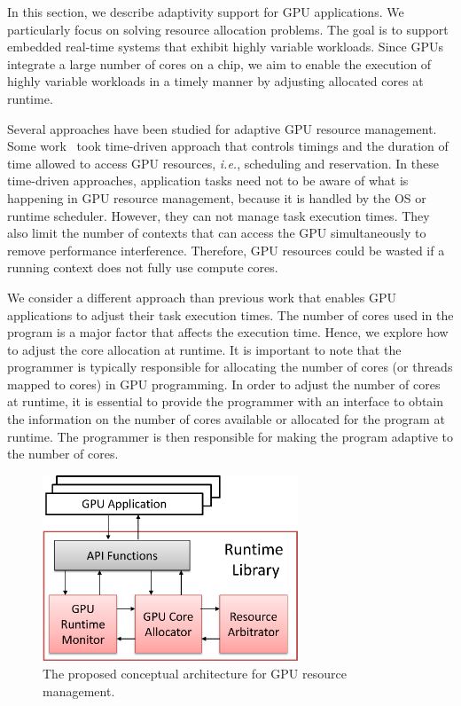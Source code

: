 \documentclass[times, 10pt, twocolumn]{article}
\begin{document}
In this section, we describe adaptivity support for GPU
applications.
We particularly focus on solving resource allocation problems.
The goal is to support embedded real-time systems that exhibit highly variable
workloads.
Since GPUs integrate a large number of cores on a chip, 
we aim to enable the execution of 
highly variable workloads in a timely manner by adjusting
allocated cores at runtime.

Several approaches have been studied for adaptive GPU resource
management.
Some work~\cite{Kato_RTAS11, Kato_RTSS11, Kato_ATC11} took
time-driven approach that controls timings and the duration of time
allowed to access GPU resources, \textit{i.e.}, scheduling and
reservation.
In these time-driven approaches, application tasks need not to be aware
of what is happening in GPU resource management, because it is handled
by the OS or runtime scheduler.
However, they can not manage task execution times.
They also limit the number of contexts that can access the GPU
simultaneously to remove performance interference.
Therefore, GPU resources could be wasted if a running context does not
fully use compute cores.

We consider a different approach than previous work that enables GPU
applications to adjust their task execution times.
The number of cores used in the program is a major
factor that affects the execution time. Hence, we explore how to
adjust the core allocation at runtime.
It is important to note that the programmer is typically responsible for
allocating the number of cores (or threads mapped to cores) in GPU
programming.
In order to adjust the number of cores at runtime, it is essential to
provide the programmer with an interface to obtain the information on
the number of cores available or allocated for the program at runtime.
The programmer is then responsible for making the program adaptive to
the number of cores.

\begin{figure}[t]
\includegraphics[width=3.0in]{architecture.eps}
\caption{The proposed conceptual architecture for GPU resource management.} 
\label{fig_arch}
\end{figure}
\end{document}
